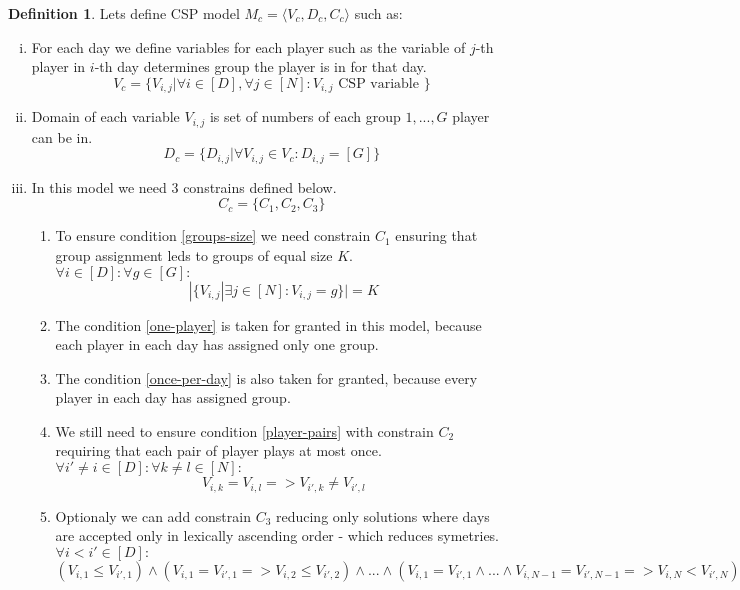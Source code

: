 \documentclass[a4paper]{article}
\theoremstyle{definition}
\newtheorem{definition}{Definition}[section]
\theoremstyle{remark}
\newcommand{\mdef}[2]{
	\theoremstyle{definition}
	\begin{definition}{#1}
	#2
	\end{definition}
}
\begin{document}
\mdef{}{ Lets define CSP model $M_c = \langle V_c,D_c,C_c \rangle$ such as:
	\begin{enumerate}[(i)]

        \item For each day we define variables for each player such as the variable of $j$-th player in $i$-th day determines group the player is in for that day.
            $$ V_c = \{V_{i,j} |  \forall i \in [D], \forall j \in [N]: V_{i,j} \text{ CSP variable }  \} $$
        \item Domain of each variable $V_{i,j}$ is set of numbers of each group $1,...,G$ player can be in. 
            $$ D_c = \{D_{i,j}| \forall V_{i,j} \in V_c: D_{i,j} = [G] \} $$
		\item In this model we need $3$ constrains defined below.
            $$ C_c = \{ C_1, C_2, C_3\} $$
		\begin{enumerate}
			\item To ensure condition \ref{groups-size} we need constrain $C_1$ ensuring that group assignment leds to 
			groups of equal size $K$. 
                \\
                $\forall i \in [D]: \forall g \in [G]:$
                $$|\{V_{i,j}| \exists j \in [N]: V_{i,j} = g \}| =  K$$
			\item The condition \ref{one-player} is taken for granted in this model, because each player in each day has assigned only one group.
			\item The condition \ref{once-per-day} is also taken for granted, because every player  in each day has assigned group.
			\item We still need to ensure condition \ref{player-pairs} with constrain $C_2$ requiring that each pair of player plays at most once.
                \\
                $\forall i' \neq i \in [D]: \forall k \neq l \in [N]:$ 
                $$V_{i,k} = V_{i,l} =>  V_{i',k} \neq V_{i',l} $$
			\item Optionaly we can add constrain $C_3$ reducing only solutions where days are accepted only in lexically ascending order - which reduces symetries.
                \\
                $\forall i < i' \in [D]:$ \\
                $(V_{i,1} \leq V_{i',1}) \land (V_{i,1} = V_{i',1} => V_{i,2} \leq V_{i',2}) \land ... \land (V_{i,1} = V_{i',1} \land ... \land V_{i,N-1} = V_{i',N-1}  => V_{i,N} < V_{i',N})$
		\end{enumerate}
	\end{enumerate}
}
\end{document}
